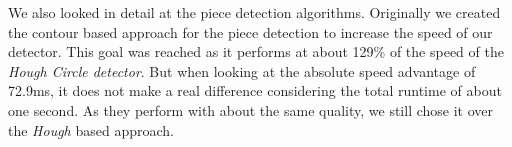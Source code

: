 	We also looked in detail at the piece detection algorithms. Originally we created the contour based approach for the piece detection to increase the speed of our detector. This goal was reached as it performs at about 129\% of the speed of the \emph{Hough Circle detector}. But when looking at the absolute speed advantage of 72.9ms, it does not make a real difference considering the total runtime of about one second. As they perform with about the same quality, we still chose it over the \emph{Hough} based approach.

	\datatable
